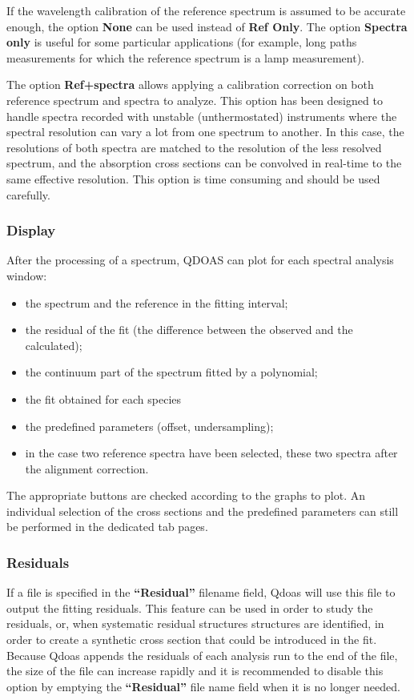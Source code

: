 If the wavelength calibration of the reference spectrum is assumed to be accurate enough, the option \textbf{None} can be used instead of \textbf{Ref Only}. The option \textbf{Spectra only} is useful for some particular applications (for example, long paths measurements for which the reference spectrum is a lamp measurement).

The option \textbf{Ref+spectra} allows applying a calibration correction on both reference spectrum and spectra to analyze. This option has been designed to handle spectra recorded with unstable (unthermostated) instruments where the spectral resolution can vary a lot from one spectrum to another. In this case, the resolutions of both spectra are matched to the resolution of the less resolved spectrum, and the absorption cross sections can be convolved in real-time to the same effective resolution. This option is time consuming and should be used carefully.

\subsubsection{Display}
After the processing of a spectrum, QDOAS can plot for each spectral analysis window:
\begin{itemize} \itemsep -3pt
\item the spectrum and the reference in the fitting interval;
\item the residual of the fit (the difference between the observed and the calculated);
\item the continuum part of the spectrum fitted by a polynomial;
\item the fit obtained for each species
\item the predefined parameters (offset, undersampling);
\item in the case two reference spectra have been selected, these two spectra after the alignment correction.
\end{itemize}
The appropriate buttons are checked according to the graphs to plot.  An individual selection of the cross sections and the predefined parameters can still be performed in the dedicated tab pages.

\subsubsection{Residuals}
If a file is specified in the \textbf{``Residual''} filename field,
Qdoas will use this file to output the fitting residuals.  This
feature can be used in order to study the residuals, or, when
systematic residual structures structures are identified, in order to
create a synthetic cross section that could be introduced in the fit.
Because Qdoas appends the residuals of each analysis run to the end of
the file, the size of the file can increase rapidly and it is
recommended to disable this option by emptying the
\textbf{``Residual''} file name field when it is no longer needed.

